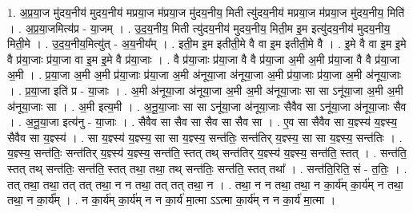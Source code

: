 \documentclass[17pt]{extarticle}
\begin{document}
1. अ॒प्र॒या॒ज मु॑दय॒नीय॑ मुदय॒नीय॑ मप्रया॒ज म॑प्रया॒ज मु॑दय॒नीय॒ मिती त्यु॑दय॒नीय॑ मप्रया॒ज म॑प्रया॒ज मु॑दय॒नीय॒ मिति॑ । . अ॒प्र॒या॒जमित्य॑प्र - या॒जम् । . उ॒द॒य॒नीय॒ मिती त्यु॑दय॒नीय॑ मुदय॒नीय॒ मिती॒म इ॒म इत्यु॑दय॒नीय॑ मुदय॒नीय॒ मिती॒मे । . उ॒द॒य॒नीय॒मित्यु॑त् - अ॒य॒नीय᳚म् । . इती॒म इ॒म इतीती॒मे वै वा इ॒म इतीती॒मे वै । . इ॒मे वै वा इ॒म इ॒मे वै प्र॑या॒जाः प्र॑या॒जा वा इ॒म इ॒मे वै प्र॑या॒जाः । . वै प्र॑या॒जाः प्र॑या॒जा वै वै प्र॑या॒जा अ॒मी अ॒मी प्र॑या॒जा वै वै प्र॑या॒जा अ॒मी । . प्र॒या॒जा अ॒मी अ॒मी प्र॑या॒जाः प्र॑या॒जा अ॒मी अ॑नूया॒जा अ॑नूया॒जा अ॒मी प्र॑या॒जाः प्र॑या॒जा अ॒मी अ॑नूया॒जाः । . प्र॒या॒जा इति॑ प्र - या॒जाः । . अ॒मी अ॑नूया॒जा अ॑नूया॒जा अ॒मी अ॒मी अ॑नूया॒जाः सा सा ऽनू॑या॒जा अ॒मी अ॒मी अ॑नूया॒जाः सा । . अ॒मी इत्य॒मी । . अ॒नू॒या॒जाः सा सा ऽनू॑या॒जा अ॑नूया॒जाः सैवैव सा ऽनू॑या॒जा अ॑नूया॒जाः सैव । . अ॒नू॒या॒जा इत्य॑नु - या॒जाः । . सैवैव सा सैव सा सैव सा सैव सा । . ए॒व सा सैवैव सा य॒ज्ञ्स्य॑ य॒ज्ञ्स्य॒ सैवैव सा य॒ज्ञ्स्य॑ । . सा य॒ज्ञ्स्य॑ य॒ज्ञ्स्य॒ सा सा य॒ज्ञ्स्य॒ सन्त॑तिः॒ सन्त॑तिर् य॒ज्ञ्स्य॒ सा सा य॒ज्ञ्स्य॒ सन्त॑तिः । . य॒ज्ञ्स्य॒ सन्त॑तिः॒ सन्त॑तिर् य॒ज्ञ्स्य॑ य॒ज्ञ्स्य॒ सन्त॑ति॒ स्तत् तथ् सन्त॑तिर् य॒ज्ञ्स्य॑ य॒ज्ञ्स्य॒ सन्त॑ति॒ स्तत् । . सन्त॑ति॒ स्तत् तथ् सन्त॑तिः॒ सन्त॑ति॒ स्तत् तथा॒ तथा॒ तथ् सन्त॑तिः॒ सन्त॑ति॒ स्तत् तथा᳚ । . सन्त॑ति॒रिति॒ सं - त॒तिः॒ । . तत् तथा॒ तथा॒ तत् तत् तथा॒ न न तथा॒ तत् तत् तथा॒ न । . तथा॒ न न तथा॒ तथा॒ न का॒र्य॑म् का॒र्य॑म् न तथा॒ तथा॒ न का॒र्य᳚म् । . न का॒र्य॑म् का॒र्य॑म् न न का॒र्य॑ मा॒त्मा ऽऽत्मा का॒र्य॑म् न न का॒र्य॑ मा॒त्मा । \newline
\end{document}

